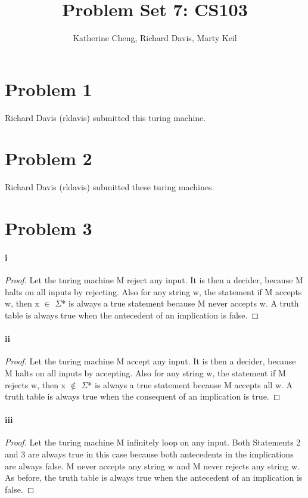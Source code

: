 \documentclass[10pt,letter]{article}
\begin{document}

\title{Problem Set 7: CS103}

\author{Katherine Cheng, Richard Davis, Marty Keil}

 
\maketitle

\section*{Problem 1}
Richard Davis (rldavis) submitted this turing machine.
\section*{Problem 2}
Richard Davis (rldavis) submitted these turing machines.
\section*{Problem 3}
\paragraph{i}
\begin{proof}
Let the turing machine M reject any input. It is then a decider, because M halts on all inputs by rejecting. Also for any string w, the statement if M accepts w, then x $\in$ $\Sigma$* is always a true statement because M never accepts w. A truth table is always true when the antecedent of an implication is false. 
\end{proof}
\paragraph{ii}
\begin{proof}
Let the turing machine M accept any input. It is then a decider, because M halts on all inputs by accepting. Also for any string w, the statement if M rejects w, then x $\notin$ $\Sigma$* is always a true statement because M accepts all w. A truth table is always true when the consequent of an implication is true. 
\end{proof}
\paragraph{iii}
\begin{proof}
Let the turing machine M infinitely loop on any input. Both Statements 2 and 3 are always true in this case because both antecedents in the implications are always false. M never accepts any string w and M never rejects any string w. As before, the truth table is always true when the antecedent of an implication is false. 
\end{proof}
\end{document}
